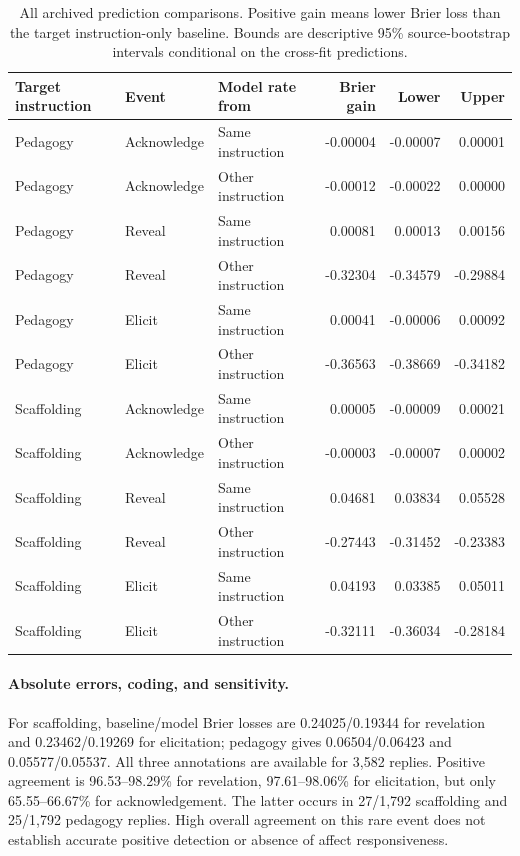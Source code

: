 \begin{table}[t]
\centering\small
\begin{tabular}{lllrrr}
\toprule
Target instruction & Event & Model rate from & Brier gain & Lower & Upper \\
\midrule
Pedagogy & Acknowledge & Same instruction & -0.00004 & -0.00007 & 0.00001 \\
Pedagogy & Acknowledge & Other instruction & -0.00012 & -0.00022 & 0.00000 \\
Pedagogy & Reveal & Same instruction & 0.00081 & 0.00013 & 0.00156 \\
Pedagogy & Reveal & Other instruction & -0.32304 & -0.34579 & -0.29884 \\
Pedagogy & Elicit & Same instruction & 0.00041 & -0.00006 & 0.00092 \\
Pedagogy & Elicit & Other instruction & -0.36563 & -0.38669 & -0.34182 \\
Scaffolding & Acknowledge & Same instruction & 0.00005 & -0.00009 & 0.00021 \\
Scaffolding & Acknowledge & Other instruction & -0.00003 & -0.00007 & 0.00002 \\
Scaffolding & Reveal & Same instruction & 0.04681 & 0.03834 & 0.05528 \\
Scaffolding & Reveal & Other instruction & -0.27443 & -0.31452 & -0.23383 \\
Scaffolding & Elicit & Same instruction & 0.04193 & 0.03385 & 0.05011 \\
Scaffolding & Elicit & Other instruction & -0.32111 & -0.36034 & -0.28184 \\
\bottomrule
\end{tabular}
\caption{All archived prediction comparisons. Positive gain means lower Brier
loss than the target instruction-only baseline. Bounds are descriptive 95\%
source-bootstrap intervals conditional on the cross-fit predictions.}
\label{tab:archive-gains}
\end{table}

\paragraph{Absolute errors, coding, and sensitivity.}
For scaffolding, baseline/model Brier losses are 0.24025/0.19344 for revelation
and 0.23462/0.19269 for elicitation; pedagogy gives 0.06504/0.06423 and
0.05577/0.05537. All three annotations are available for 3,582 replies. Positive agreement
is 96.53--98.29\% for revelation, 97.61--98.06\% for elicitation, but only
65.55--66.67\% for acknowledgement. The latter occurs in 27/1,792 scaffolding
and 25/1,792 pedagogy replies. High overall agreement on this rare event does
not establish accurate positive detection or absence of affect responsiveness.

